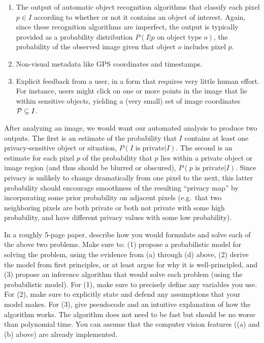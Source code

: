 \documentclass[11pt]{article}
\begin{document}
\begin{appendices}
\begin{enumerate}
\begin{enumerate}
\item The output of automatic object recognition algorithms that
  classify each pixel $p \in I$ according to whether or not it
  contains an object of interest.  Again, since these recognition
algorithms are imperfect, the output
is typically provided as a probability distribution $P(I |
  p \mbox{ on object type } o)$, the probability of the observed image
given that object $o$ includes pixel $p$.

\item Non-visual metadata like GPS coordinates and timestamps.

\item Explicit feedback from a user, in a form that requires very
  little human effort. For instance, users might click on one or more
  points in the image that lie within sensitive objects, yielding a
  (very small) set of image coordinates ${\cal P} \subseteq I$.
\end{enumerate}

After analyzing an image, we would want our automated analysis to
produce two outputs. The first is an estimate of the probability
that $I$
contains at least one
privacy-sensitive object or situation, $P(I \mbox{ is private} |I)$. The
second is an estimate for each pixel $p$ of the probability that
$p$ lies within a private object or image region (and thus should be
blurred or obscured), $P(p \mbox{ is private} | I)$. Since privacy is
unlikely to change dramatically from one pixel to the  next, this
latter probability should encourage smoothness of the resulting
``privacy map'' by incorporating some prior probability on adjacent
pixels (e.g.\ that two neighboring pixels are both private or both
not private with some high probability, and have different privacy
values with some low probability).

In a roughly 5-page paper, describe how you would formulate and solve
each of the above two problems. Make sure to: (1) propose a probabilistic
model for solving the problem, using the evidence from (a) through (d)
above, (2) derive the model from first
principles, or at least argue for why it is well-principled, and (3)
propose an inference algorithm that would solve each problem (using
the probabilistic model).  For (1), make sure to precisely define any
variables you use.
For (2), make sure to explicitly state and defend any assumptions that
your model makes.
 For (3), give pseudocode and an intuitive
explanation of how the algorithm works. The algorithm does not need to
be fast but should be no worse than polynomial time.  You can assume
that the computer vision features ((a) and (b) above) are already
implemented.



\end{enumerate}
\end{appendices}
\end{document}
